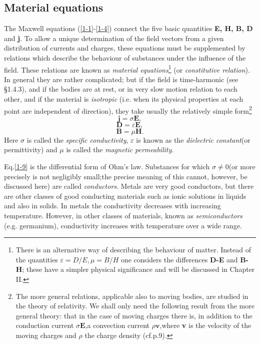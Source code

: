 \documentclass[lang=en,11pt]{elegantbook}
\begin{document}
	\subsection{Material equations}
	The Maxwell equations (\ref{1-1}-\ref{1-4}) connect the five basic quantities \textbf{E, H, B, D} and \textbf{j}. To allow a unique determination of the field vectors from a given distribution of currents and charges, these equations must be supplemented by relations which describe the behaviour of substances under the influence of the field. These relations are known as \textit{material equations}\footnote{There is an alternative way of describing the behaviour of matter. Instead of the quantities $\varepsilon=D/E,\mu=B/H$ one considers the differences \textbf{D-E} and \textbf{B-H}; these have a simpler physical significance and will be discussed in Chapter II.} (or \textit{constitutive relation}). In general they are rather complicated; but if the field is time-harmonic (see \S1.4.3), and if the bodies are at rest, or in very slow motion relation to each other, and if the material is \textit{isotropic} (i.e. when its physical properties at each point are independent of direction), they take usually the relatively simple form\footnote{The more general relations, applicable also to moving bodies, are studied in the theory of relativity. We shall only need the following result from the more general theory: that in the case of moving charges there is, in addition to the conduction current $\sigma\textbf{E}$,a convection current $\rho\textbf{v}$,where \textbf{v} is the velocity of the moving charges and $\rho$ the charge density (cf.p.9).}
	\begin{equation}
	\mathbf{j}=\sigma\mathbf{E},
	\label{1-9}
	\end{equation}
	\begin{equation}
	\mathbf{D}=\varepsilon\mathbf{E},
	\label{1-10}
	\end{equation}
	\begin{equation}
	\mathbf{B}=\mu\mathbf{H}.
	\label{1-11}
	\end{equation}
	Here $\sigma$ is called the \textit{specific conductivity}, $\varepsilon$ is known as the \textit{dielectric constant}(or permittivity) and $\mu$ is called the \textit{magnetic permeability}.\par
	Eq.\eqref{1-9} is the differential form of Ohm's law. Substances for which $\sigma\neq0$(or more precisely is not negligibly small;the precise meaning of this cannot, however, be discussed here) are called \textit{conductors}. Metals are very good conductors, but there are other classes of good conducting materials such as ionic solutions in liquids and also in solids. In metals the conductivity decreases with increasing temperature. However, in other classes of materials, known as  \textit{semiconductors} (e.g. germanium), conductivity increases with temperature over a wide range.\par
\end{document}
